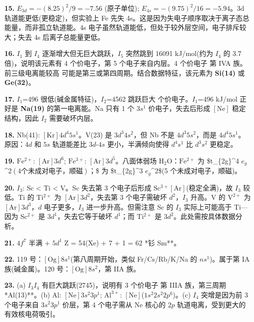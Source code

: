 \textbf{15.} \(E_{3d} = -(8.25)^2/9 = -7.56\) (原子单位); \(E_{4s} = -(9.75)^2/16 = -5.94\)。3d 轨道能更低(更稳定)，但实验上 Fe 先失 4s。这是因为失电子顺序取决于离子态总能量，而非孤立轨道能。4s 电子虽然轨道能低，但处于较外层空间，电子排斥较大；失去 4s 后离子总能量更低。

\textbf{16.} \(I_1\) 到 \(I_4\) 逐渐增大但无巨大跳跃，\(I_5\) 突然跳到 16091 kJ/mol(约为 \(I_4\) 的 3.7 倍)，说明该元素有 4 个价电子，第 5 个电子来自内层。4 个价电子 \箭 第 IVA 族。前三级电离能较高 \箭 可能是第三或第四周期。结合数据特征，该元素为 \textbf{Si(14)} 或 \textbf{Ge(32)}。

\textbf{17.} \(I_1\)=496 很低(碱金属特征)，\(I_2\)=4562 跳跃巨大  个价电子。\(I_1\)=496 kJ/mol 正好是 \textbf{Na(19)} 的第一电离能。Na 只有 1 个 \(3s^1\) 价电子，失去后形成 \([\mathrm{Ne}]\) 稳定结构，因此 \(I_2\) 需要破坏内层。

\textbf{18.} Nb(41): \([\mathrm{Kr}]4d^4 5s^1\)。V(23) 是 \(3d^3 4s^2\)，但 Nb 不是 \(4d^3 5s^2\)，而是 \(4d^4 5s^1\)。原因：\(4d\) 和 \(5s\) 轨道能差比 \(3d\)-\(4s\) 更小，半满倾向使得 \(d^4 s^1\) 比 \(d^3 s^2\) 更稳定。

\textbf{19.} \(\mathrm{Fe^{2+}}\): \([\mathrm{Ar}]3d^6\); \(\mathrm{Fe^{3+}}\): \([\mathrm{Ar}]3d^5\)。八面体弱场 \(\mathrm{H_2O}\)：\(\mathrm{Fe^{2+}}\) 为 \$t\_\{2g\}\^{}4 \(e_g\)\^{}2\((4 个未成对电子，顺磁)；\)\$ 为 \$t\_\{2g\}\^{}3 \(e_g\)\^{}2\$(5 个未成对电子，顺磁)。

\textbf{20.} \(I_3\): Sc \textless{} Ti \textless{} V。Sc 失去第 3 个电子后形成 \(\mathrm{Sc^{3+}} [\mathrm{Ar}]\)(稳定全满)，故 \(I_3\) 较低。Ti 的 \(\mathrm{Ti^{2+}}\) 为 \([\mathrm{Ar}]3d^2\)，失去第 3 个电子需破坏 \(d^2\)，\(I_3\) 升高。V 的 \(\mathrm{V^{2+}}\) 为 \([\mathrm{Ar}]3d^3\)，\(d\) 电子更多，\(I_3\) 进一步升高。但需注意 Sc 的 \(I_3\) 实际上可能高于 Ti---因为 \(\mathrm{Sc^{2+}}\) 是 \(3d^1\)，失去它等于破坏 \(d^1\)；而 \(\mathrm{Ti^{2+}}\) 是 \(3d^2\)。此处需按具体数据分析。

\textbf{21.} \(4f^7\) 半满 + \(5d^1\) \箭 Z = 54(Xe) + 7 + 1 = 62 \箭 **钐 Sm**。

\textbf{22.} 119 号：\([\mathrm{Og}]8s^1\)(第八周期开始，类似 Fr/Cs/Rb/K/Na 的 \(ns^1\))。属于第 IA 族(碱金属)。120 号：\([\mathrm{Og}]8s^2\)，第 IIA 族。

\textbf{23.} (a) \(I_3\)\箭\(I_4\) 有巨大跳跃(2745)，说明有 3 个价电子 \箭 第 IIIA 族，第三周期 \箭 **Al(13)**。(b) Al: \([\mathrm{Ne}]3s^2 3p^1\); \(\mathrm{Al^{3+}}\): \([\mathrm{Ne}]\)(\(1s^2 2s^2 2p^6\))。(c) \(I_4\) 突增是因为前 3 个电子来自 \(3s^2 3p^1\) 价层，第 4 个电子需从 \(\mathrm{Ne}\) 核心的 \(2p\) 轨道电离，受到更大的有效核电荷吸引。

